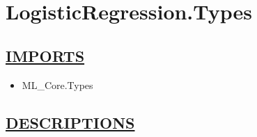 \chapter*{LogisticRegression.Types}
\hypertarget{ecldoc:toc:LogisticRegression.Types}{}

\section*{\underline{IMPORTS}}
\begin{itemize}
\item ML\_Core.Types
\end{itemize}

\section*{\underline{DESCRIPTIONS}}
